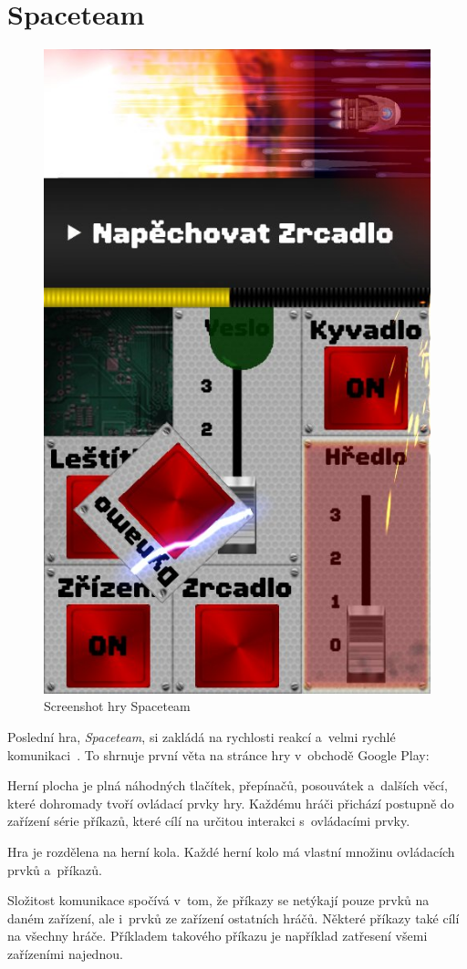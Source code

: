\section{Spaceteam}

\begin{figure}
    \centering
    \includegraphics[width=0.5\linewidth]{assets/competitive-apps/spaceteam.jpg}
    \caption{Screenshot hry Spaceteam~\cite{henrysmithinc_spaceteam}}
    \label{fig:spaceteam}
\end{figure}

Poslední hra, \emph{Spaceteam}, si zakládá na rychlosti reakcí a~velmi rychlé
komunikaci~\cite{henrysmithinc_spaceteam}.
To shrnuje první věta na stránce hry v~obchodě Google Play:
\emph{}~\cite{henrysmithinc_spaceteam}

Herní plocha je plná náhodných tlačítek, přepínačů, posouvátek a~dalších věcí,
které dohromady tvoří ovládací prvky hry.
Každému hráči přichází \mbox{postupně} do zařízení série příkazů,
které cílí na určitou interakci s~ovládacími prvky.

Hra je rozdělena na herní kola.
Každé herní kolo má vlastní množinu ovládacích prvků a~příkazů.

Složitost komunikace spočívá v~tom,
že příkazy se netýkají pouze prvků na daném zařízení,
ale i~prvků ze zařízení ostatních hráčů.
Některé příkazy také cílí na všechny hráče.
Příkladem takového příkazu je například zatřesení všemi zařízeními najednou.

